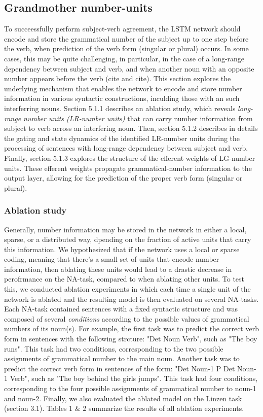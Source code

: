 \subsection{Grandmother number-units}
To succeessfully perform subject-verb agreement, the LSTM network should encode and store the grammatical number of the subject up to one step before the verb, when prediction of the verb form (singular or plural) occurs. In some cases, this may be quite challenging, in particular, in the case of a long-range dependency between subject and verb, and when another noun with an opposite number appears before the verb (cite and cite). This section explores the underlying mechanism that enables the network to encode and store number information in various syntactic constructions, inculding those with an such interferring nouns. Section 5.1.1 describes an ablation study, which reveals \textit{long-range number units (LR-number units)} that can carry number information from subject to verb across an interfering noun. Then, section 5.1.2 describes in details the gating and state dynamics of the identified LR-number units during the processing of sentences with long-range dependency between subject and verb. Finally, section 5.1.3 explores the structure of the efferent weights of LG-number units. These efferent weights propagate grammatical-number information to the output layer, allowing for the prediction of the proper verb form (singular or plural). 

\subsubsection{Ablation study}
Generally, number information may be stored in the network in either a local, sparse, or a distributed way, dpending on the fraction of active units that carry this information. We hypothesized that if the network uses a local or sparse coding, meaning that there's a small set of units that encode number information, then ablating these units would lead to a drastic decrease in perofrmance on the NA-task, compared to when ablating other units. To test this, we conducted ablation experiments in which each time a single unit of the network is ablated and the resulting model is then evaluated on several NA-tasks. Each NA-task contained sentences with a fixed syntactic structure and was composed of several \textit{conditions} according to the possible values of grammatical numbers of its noun(s). For example, the first task was to predict the correct verb form in sentences with the following strcture: "Det Noun Verb", such as "The boy runs". This task had two conditions, corresponding to the two possible assignments of grammatical number to the main noun. Another task was to predict the correct verb form in sentences of the form: "Det Noun-1 P Det Noun-1 Verb", such as "The boy behind the girls jumps". This task had four conditions, corresponding to the four possible assignments of grammatical number to noun-1 and noun-2. Finally, we also evaluated the ablated model on the Linzen task (section 3.1). Tables 1 \& 2 summarize the results of all ablation experiments. 



